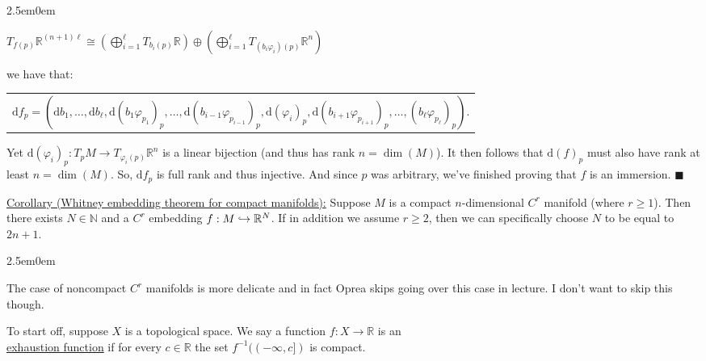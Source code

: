 \documentclass{book}
\renewcommand{\hookrightarrow}{\lhook\joinrel\rightarrow}
\newcommand{\hTwo}{%
\color{Black}%
   \fontsize{13}{15}\selectfont%
}
\newcommand{\exTwo}{%
   \color{Purple}%
   \fontsize{13}{15}\selectfont%
}
\newenvironment{myIndent}{%
   \begin{adjustwidth}{2.5em}{0em}%
}{%
   \end{adjustwidth}%
}
\newcommand{\udefine}[1]{{%
   \setulcolor{Red}%
   \setul{0.14em}{0.07em}%
   \ul{#1}%
}}
\newcommand{\df}{\mathrm{d}}
\newcommand{\mySepThree}[1][.]{%
   {\noindent\color{#1}{\rule{6in}{0.25mm}}}\\%
}
\newcommand{\retTwo}{\hfill\bigbreak}
\begin{document}
\begin{myIndent}
	{\centering$T_{f(p)}\mathbb{R}^{(n + 1)\ell} \cong \left(\bigoplus_{i=1}^\ell T_{b_i(p)}\mathbb{R}\right) \oplus \left(\bigoplus_{i=1}^\ell T_{(b_i\varphi_i) (p)}\mathbb{R}^n\right)$\\ [4pt]\par}
	
	we have that:
	
	{\centering\begin{tabular}{l}
		$\df f_p = (\df b_1, \ldots, \df b_\ell, \df (b_1 \varphi_{p_1})_p, \ldots, \df (b_{i-1} \varphi_{p_{i-1}})_p, \df (\varphi_i)_p, \df (b_{i+1} \varphi_{p_{i+1}})_p, \ldots, (b_\ell \varphi_{p_\ell})_p)$.
	\end{tabular}\retTwo\par}

	Yet $\df (\varphi_i)_p : T_p M \to T_{\varphi_i(p)}\mathbb{R}^n$ is a linear bijection (and thus has rank $n = \dim(M)$). It then follows that $\df (f)_p$ must also have rank at least $n = \dim(M)$. So, $\df f_p$ is full rank and thus injective. And since $p$ was arbitrary, we've finished proving that $f$ is an immersion. $\blacksquare$\retTwo
\end{myIndent}

\exTwo\ul{Corollary (Whitney embedding theorem for compact manifolds):} Suppose $M$ is a compact $n$-dimensional $C^r$ manifold (where $r \geq 1$). Then there exists $N \in \mathbb{N}$ and a $C^r$ embedding $f: M \hookrightarrow \mathbb{R}^N$. If in addition we assume $r \geq 2$, then we can specifically choose $N$ to be equal to $2n + 1$.\retTwo

\hTwo\begin{myIndent}\mySepThree\end{myIndent}

The case of noncompact $C^r$ manifolds is more delicate and in fact Oprea skips going over this case in lecture. I don't want to skip this though.\retTwo

To start off, suppose $X$ is a topological space. We say a function $f: X \to \mathbb{R}$ is an\\ \udefine{exhaustion function} if for every $c \in \mathbb{R}$ the set $f^{-1}((-\infty, c])$ is compact.\retTwo
\end{document}
